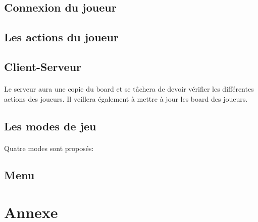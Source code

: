 \documentclass[10pt, a4paper]{article}
\begin{document}
		\subsection{Connexion du joueur}
		
		\subsection{Les actions du joueur}
		
		\subsection{Client-Serveur}
		\paragraph{}Le serveur aura une copie du board et se tâchera de devoir vérifier les différentes actions des joueurs. Il veillera également à  mettre à jour les board des joueurs.
		\subsection{Les modes de jeu}
		\paragraph{}Quatre modes sont proposés:
		
		\subsection{Menu}
		
	\section{Annexe}
	
	
		
		
		
		
\end{document}
